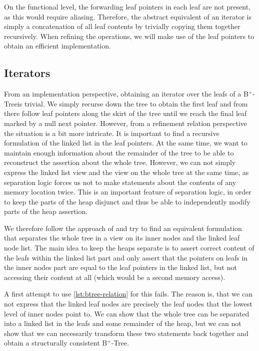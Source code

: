 \documentclass[a4paper,UKenglish,cleveref, autoref, thm-restate]{lipics-v2021}
\newcommand{\btree}{B$^+$-Tree}
\begin{document}
On the functional level, the forwarding leaf pointers in each leaf
are not present, as this would require aliasing.
Therefore, the abstract equivalent of an iterator
is simply a concatenation of all leaf contents by
trivially copying them together recursively.
When refining the operations, we will make use of the leaf pointers
to obtain an efficient implementation.

\subsection{Iterators}
\label{sec:imperative_iter}

From an implementation perspective, obtaining an iterator over the leafs
of a \btree is trivial.
We simply recurse down the tree to obtain the first leaf and from there follow leaf
pointers along the skirt of the tree until we reach the final leaf marked by a null next pointer.
However, from a refinement relation perspective the situation is a bit more intricate.
It is important to find a recursive formulation of the linked list in the leaf pointers.
At the same time, we want to maintain enough information about the remainder of the tree
to be able to reconstruct the assertion about the whole tree.
However, we can not simply express the linked list view and the view on the
whole tree at the same time,
as separation logic forces us not to make statements about the contents of
any memory location twice.
This is an important feature of separation logic,
in order to keep the parts of the heap disjunct and
thus be able to independently modify parts of the heap assertion.

We therefore follow the approach of \cite{DBLP:conf/popl/MalechaMSW10} and
try to find an equivalent formulation that separates the whole tree in a
view on its inner nodes and the linked leaf node list.
The main idea to keep the heaps separate is to
assert correct content of the leafs within the linked list part
and only assert that the pointers on leafs in the inner nodes part
are equal to the leaf pointers in the linked list, but not accessing
their content at all (which would be a second memory access).

A first attempt to use \autoref{lst:btree-relation} for this fails.
The reason is, that we can not express that the linked leaf nodes
are precisely the leaf nodes that the lowest level of inner nodes point to.
We can show that the whole tree can be separated into a linked list in the leafs
and some remainder of the heap, but we can not show that we can necessarily transform
these two statements back together and obtain a structurally consistent \btree.
\end{document}
